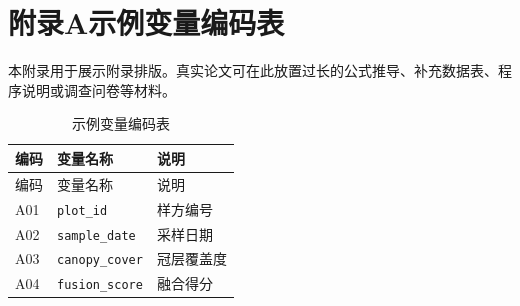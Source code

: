 \section*{附录A\quad 示例变量编码表}
{}

本附录用于展示附录排版。真实论文可在此放置过长的公式推导、补充数据表、程序说明或调查问卷等材料。

\begin{longtable}{lll}
  \caption{示例变量编码表}\\
  \toprule
  编码 & 变量名称 & 说明 \\
  \midrule
  \endfirsthead
  \toprule
  编码 & 变量名称 & 说明 \\
  \midrule
  \endhead
  A01 & \texttt{plot\_id} & 样方编号 \\
  A02 & \texttt{sample\_date} & 采样日期 \\
  A03 & \texttt{canopy\_cover} & 冠层覆盖度 \\
  A04 & \texttt{fusion\_score} & 融合得分 \\
  \bottomrule
\end{longtable}
